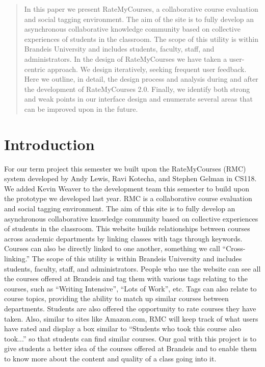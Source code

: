 \documentclass[12pt]{report}
\begin{document}
\begin{abstract}
In this paper we present RateMyCourses, a collaborative course evaluation and social tagging environment. The aim of the site is to fully develop an asynchronous collaborative knowledge community based on collective experiences of students in the classroom. The scope of this utility is within Brandeis University and includes students, faculty, staff, and administrators. In the design of RateMyCourses we have taken a user-centric approach. We design iteratively, seeking frequent user feedback. Here we outline, in detail, the design process and analysis during and after the development of RateMyCourses 2.0. Finally, we identify both strong and weak points in our interface design and enumerate several areas that can be improved upon in the future.
\end{abstract}

\tableofcontents

\chapter{Introduction}

For our term project this semester we built upon the RateMyCourses (RMC) system developed by Andy Lewis, Ravi Kotecha, and Stephen Gelman in CS118.  We added Kevin Weaver to the development team this semester to build upon the prototype we developed last year. RMC is a collaborative course evaluation and social tagging environment. The aim of this site is to fully develop an asynchronous collaborative knowledge community based on collective experiences of students in the classroom. This website builds relationships between courses across academic departments by linking classes with tags through keywords. Courses can also be directly linked to one another, something we call ``Cross-linking.'' The scope of this utility is within Brandeis University and includes students, faculty, staff, and administrators. People who use the website can see all the courses offered at Brandeis and tag them with various tags relating to the courses, such as ``Writing Intensive'', ``Lots of Work'', etc. Tags can also relate to course topics, providing the ability to match up similar courses between departments. Students are also offered the opportunity to rate courses they have taken. Also, similar to sites like Amazon.com, RMC will keep track of what users have rated and display a box similar to ``Students who took this course also took...'' so that students can find similar courses. Our goal with this project is to give students a better idea of the courses offered at Brandeis and to enable them to know more about the content and quality of a class going into it.
\end{document}
